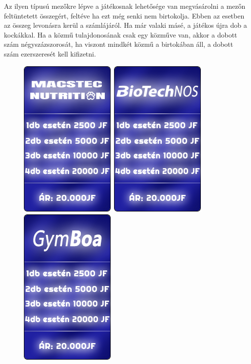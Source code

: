 Az ilyen típusú mezőkre lépve a játékosnak lehetősége van megvásárolni a mezőn feltüntetett összegért, feltéve ha ezt még senki nem birtokolja. Ebben az esetben az összeg levonásra kerül a számlájáról. Ha már valaki másé, a játékos újra dob a kockákkal. Ha a közmű tulajdonosának csak egy közműve van, akkor a dobott szám négyszázszorosát, ha viszont mindkét közmű a birtokában áll, a dobott szám ezerszeresét kell kifizetni.


\begin{figure}[h!]
\centering
\includegraphics[scale=0.4]{images/b1.png}
\includegraphics[scale=0.4]{images/b2.png}
\includegraphics[scale=0.4]{images/b3.png}

\end{figure}
